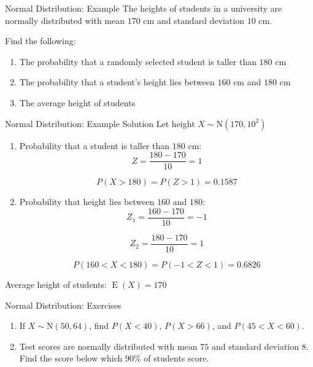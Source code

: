 \documentclass[12pt, aspectratio=169]{beamer}
\DeclareMathOperator{\E}{E}
\begin{document}
	\begin{frame}{Normal Distribution: Example}
		The heights of students in a university are normally distributed with mean \(170\) cm and standard deviation \(10\) cm.

		\vspace{0.5em}

		Find the following:

		\begin{enumerate}
			\item The probability that a randomly selected student is taller than \(180\) cm
			\item The probability that a student's height lies between \(160\) cm and \(180\) cm
			\item The average height of students
		\end{enumerate}
	\end{frame}


	\begin{frame}{Normal Distribution: Example Solution}
		Let height \(X \sim \mathrm{N}(170, 10^2)\)

		\begin{enumerate}
			\item Probability that a student is taller than \(180\) cm:
			\[
				Z = \frac{180 - 170}{10} = 1
			\]

			\[
				P(X>180) = P(Z>1) = 0.1587
			\]

			\item Probability that height lies between \(160\) and \(180\):
			\[
				Z_1 = \frac{160-170}{10} = -1
			\]

			\[
				Z_2 = \frac{180-170}{10} = 1
			\]

			\[
				P(160<X<180) = P(-1<Z<1) = 0.6826
			\]
		\end{enumerate}

		\vspace{0.5em}

		Average height of students: \(\E(X) = 170\)
	\end{frame}


	\begin{frame}{Normal Distribution: Exercises}
		\begin{enumerate}
			\item If \(X \sim \mathrm{N}(50, 64)\), find \(P(X<40)\), \(P(X>66)\), and \(P(45<X<60)\).
			\item Test scores are normally distributed with mean \(75\) and standard deviation \(8\). Find the score below which \(90\%\) of students score.
		\end{enumerate}
	\end{frame}
\end{document}
